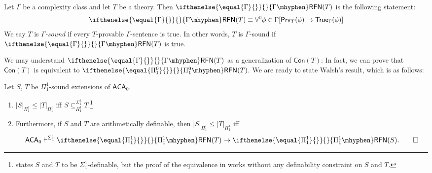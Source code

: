 \documentclass{mhkr}
\newcommand{\added}[1]{#1}
\newcommand{\Prv}{\mathsf{Prv}}
\newcommand{\True}{\mathsf{True}}
\newcommand{\Con}{\mathsf{Con}}
\newcommand{\RFN}[1][]{\ifthenelse{\equal{#1}{}}{}{#1\mhyphen}\mathsf{RFN}}
\newcommand{\ACA}{\mathsf{ACA}}
\begin{document}
\begin{definition} \label{Definition: Gamma-RFN}
    Let $\Gamma$ be a complexity class and let $T$ be a theory. Then $\RFN[\Gamma](T)$ is the following statement:
    \begin{equation*}
        \RFN[\Gamma](T) \equiv \forall^0 \phi\in \Gamma [\Prv_T(\phi)\to \True_\Gamma(\phi)]
    \end{equation*}
    We say $T$ is \emph{$\Gamma$-sound} if every $T$-provable $\Gamma$-sentence is true. In other words, $T$ is $\Gamma$-sound if $\RFN[\Gamma](T)$ is true.
\end{definition}
We may understand $\RFN[\Gamma](T)$ as a generalization of $\Con(T)$: In fact, we can prove that $\Con(T)$ is equivalent to $\RFN[\Pi^0_1](T)$. 
\added{We are ready to state Walsh's result, which is as follows:}
\begin{theorem} \label{Theorem: Walsh's characterizations of PTO}
    \pushQED{\qed}
    Let $S$, $T$ be $\Pi^1_1$-sound extensions of $\ACA_0$.
    \begin{enumerate}
        \item $|S|_{\Pi^1_1}\le |T|_{\Pi^1_1}$ iff $S\subseteq^{\Sigma^1_1}_{\Pi^1_1} T$.\footnote{\added{\cite{Walsh2023characterizations} states $S$ and $T$ to be $\Sigma^1_1$-definable, but the proof of the equivalence in \cite[\S 3.1]{Walsh2023characterizations} works without any definability constraint on $S$ and $T$.}}
        \item Furthermore, if $S$ and $T$ are arithmetically definable, then $|S|_{\Pi^1_1}\le |T|_{\Pi^1_1}$ iff
        \begin{equation*}
            \ACA_0 \vdash^{\Sigma^1_1} \RFN[\Pi^1_1](T)\to\RFN[\Pi^1_1](S). \qedhere 
        \end{equation*}
    \end{enumerate}
\end{theorem}
\end{document}
